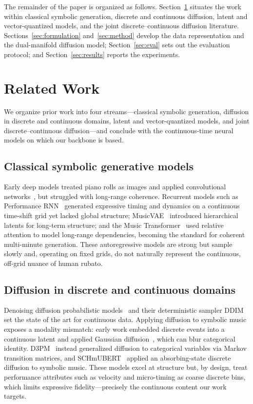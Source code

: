 \documentclass[review]{elsarticle}
\begin{document}
The remainder of the paper is organized as follows. Section~\ref{sec:related} situates the
work within classical symbolic generation, discrete and continuous diffusion, latent and
vector-quantized models, and the joint discrete--continuous diffusion literature.
Sections~\ref{sec:formulation} and~\ref{sec:method} develop the data representation and the
dual-manifold diffusion model; Section~\ref{sec:eval} sets out the evaluation protocol; and
Section~\ref{sec:results} reports the experiments.

\section{Related Work}
\label{sec:related}

We organize prior work into four streams---classical symbolic generation, diffusion in
discrete and continuous domains, latent and vector-quantized models, and joint
discrete--continuous diffusion---and conclude with the continuous-time neural models on
which our backbone is based.

\subsection{Classical symbolic generative models}
Early deep models treated piano rolls as images and applied convolutional
networks~\cite{yang2017midinet}, but struggled with long-range coherence. Recurrent
models such as Performance RNN~\cite{simon2017performancernn} generated expressive timing
and dynamics on a continuous time-shift grid yet lacked global structure;
MusicVAE~\cite{roberts2018musicvae} introduced hierarchical latents for long-term
structure; and the Music Transformer~\cite{huang2018musictransformer} used relative
attention to model long-range dependencies, becoming the standard for coherent
multi-minute generation. These autoregressive models are strong but sample slowly and,
operating on fixed grids, do not naturally represent the continuous, off-grid nuance of
human rubato.

\subsection{Diffusion in discrete and continuous domains}
Denoising diffusion probabilistic models~\cite{ho2020ddpm} and their deterministic
sampler DDIM~\cite{song2021ddim} set the state of the art for continuous data. Applying
diffusion to symbolic music exposes a modality mismatch: early work embedded discrete
events into a continuous latent and applied Gaussian diffusion~\cite{mittal2021symbolic},
which can blur categorical identity. D3PM~\cite{austin2021d3pm} instead generalized
diffusion to categorical variables via Markov transition matrices, and
SCHmUBERT~\cite{plasser2023schmubert} applied an absorbing-state discrete diffusion to
symbolic music. These models excel at structure but, by design, treat performance
attributes such as velocity and micro-timing as coarse discrete bins, which limits
expressive fidelity---precisely the continuous content our work targets.
\end{document}
